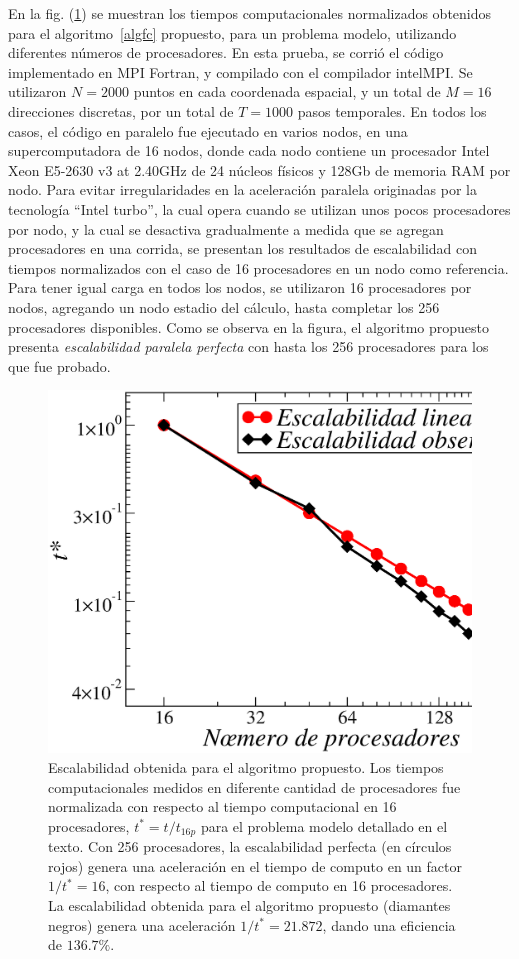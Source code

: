 En la fig. (\ref{fig:scala}) se muestran los tiempos computacionales 
normalizados obtenidos 
para el algoritmo~\eqref{algfc} propuesto, para un 
problema modelo, utilizando diferentes números de procesadores. 
En esta prueba, se corrió el código implementado en MPI Fortran, 
y compilado con el compilador intelMPI. Se utilizaron $N=2000$ 
puntos en cada coordenada espacial, y un total de $M=16$ direcciones 
discretas, por un total de $T=1000$ pasos temporales.  
En todos los casos, el código en paralelo 
fue ejecutado en varios nodos, en una supercomputadora 
de 16 nodos, donde cada nodo contiene un procesador
Intel Xeon E5-2630 v3 at 2.40GHz de 24 núcleos físicos 
y 128Gb de memoria RAM por nodo. 
Para evitar irregularidades en la aceleración paralela 
originadas por la tecnología ``Intel turbo'', la cual 
opera cuando se utilizan unos pocos procesadores por nodo, 
y la cual se desactiva gradualmente a medida que se agregan procesadores 
en una corrida, se presentan los resultados de escalabilidad 
con tiempos normalizados con el caso de 16 procesadores 
en un nodo como referencia. Para tener igual carga en todos los nodos, 
se utilizaron 16 procesadores por nodos, agregando un nodo 
estadio del cálculo, hasta completar los 256 procesadores disponibles. 
Como se observa en la figura, el algoritmo propuesto 
presenta \textit{escalabilidad paralela perfecta} 
con hasta los 256 procesadores para los que fue probado.

\begin{figure}[h!]
\centering
  \includegraphics[width=0.5\linewidth]{figuras/escalabilidad.eps}
  \caption{Escalabilidad obtenida para el algoritmo propuesto. 
  Los tiempos computacionales medidos en diferente cantidad 
  de procesadores fue normalizada con respecto al tiempo computacional 
  en 16 procesadores, $t^*=t/t_{16p}$ para 
  el problema modelo detallado en el texto. 
  Con 256 procesadores, la escalabilidad perfecta (en círculos rojos) 
  genera una aceleración en el tiempo de computo en un factor $1/t^*=16$, 
  con respecto al tiempo de computo en 16 procesadores. 
  La escalabilidad obtenida para el algoritmo propuesto 
  (diamantes negros) genera una aceleración $1/t^*=21.872$, dando 
 una eficiencia de $136.7\%$. 
}
 \label{fig:scala}
\end{figure}

